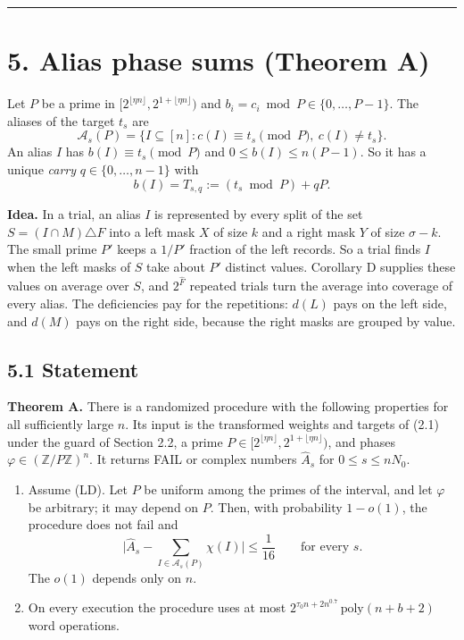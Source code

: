 \documentclass[10pt,a4paper]{article}
\begin{document}
\medskip\noindent\rule{\linewidth}{0.4pt}\medskip

\section*{5. Alias phase sums (Theorem A)}

Let $P$ be a prime in $[2^{\lfloor\eta n\rfloor}, 2^{1+\lfloor\eta n\rfloor})$ and $b_i = c_i \bmod P \in \{0, \dots, P-1\}$.
The aliases of the target $t_s$ are
\[\mathcal A_s(P) = \{I \subseteq [n] : c(I) \equiv t_s \pmod P,\ c(I) \ne t_s\}.\]
An alias $I$ has $b(I) \equiv t_s \pmod P$ and $0 \le b(I) \le n(P-1)$. So it has a unique \emph{carry}
$q \in \{0, \dots, n-1\}$ with
\[b(I) = T_{s,q} := (t_s \bmod P) + qP.\]

\textbf{Idea.} In a trial, an alias $I$ is represented by every split of the set $S = (I\cap M)\triangle F$ into a left mask $X$
of size $k$ and a right mask $Y$ of size $\sigma - k$. The small prime $P'$ keeps a $1/P'$ fraction of the left
records. So a trial finds $I$ when the left masks of $S$ take about $P'$ distinct values. Corollary D supplies these
values on average over $S$, and $2^{\hat F}$ repeated trials turn the average into coverage of every alias. The
deficiencies pay for the repetitions: $d(L)$ pays on the left side, and $d(M)$ pays on the right side, because the
right masks are grouped by value.

\subsection*{5.1 Statement}

\textbf{Theorem A.} There is a randomized procedure with the following properties for all sufficiently large $n$. Its input is
the transformed weights and targets of (2.1) under the guard of Section 2.2, a prime
$P \in [2^{\lfloor\eta n\rfloor}, 2^{1+\lfloor\eta n\rfloor})$, and phases $\varphi \in (\mathbb Z/P\mathbb Z)^n$. It returns
FAIL or complex numbers $\hat A_s$ for $0 \le s \le nN_0$.

\begin{enumerate}
\item Assume (LD). Let $P$ be uniform among the primes of the interval, and let $\varphi$ be arbitrary; it may depend on $P$.
Then, with probability $1 - o(1)$, the procedure does not fail and
\[\Big|\hat A_s - \sum_{I\in\mathcal A_s(P)}\chi(I)\Big| \le \frac1{16}\qquad\text{for every } s.\]
The $o(1)$ depends only on $n$.
\item On every execution the procedure uses at most $2^{\tau_0 n + 2n^{0.7}}\,\mathrm{poly}(n+b+2)$ word operations.
\end{enumerate}
\end{document}
